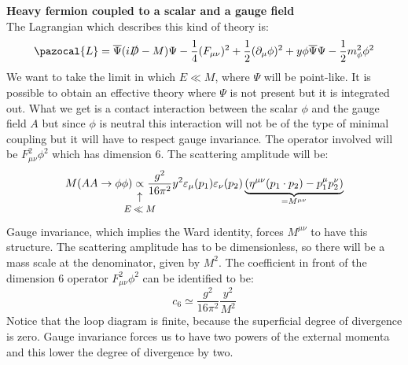 \documentclass[../main.tex]{subfiles}
\begin{document}
\begin{example}\textbf{Heavy fermion coupled to a scalar and a gauge field}\\
The Lagrangian which describes this kind of theory is:
\[
\pazocal{L}=\overline{\Psi}(i\slashed{D}-M)\Psi-\frac{1}{4}(F_{\mu\nu})^2+\frac{1}{2}(\partial_\mu\phi)^2+y\phi\overline{\Psi}\Psi-\frac{1}{2}m_\phi^2\phi^2
\]
We want to take the limit in which $E\ll M$, where $\Psi$ will be point-like. It is possible to obtain an effective theory where $\Psi$ is not present but it is integrated out. What we get is a contact interaction between the scalar $\phi$ and the gauge field $A$ but since $\phi$ is neutral this interaction will not be of the type of minimal coupling but it will have to respect gauge invariance. 
The operator involved will be $F^2_{\mu\nu}\phi^2$ which has dimension 6. The scattering amplitude will be:
\[
M(AA\to\phi\phi)\underset{\mathclap{\tikz \node {$\uparrow$} node [below=1ex] {\footnotesize $E\ll M$ };}}{\propto}\frac{g^2}{16\pi^2}y^2\varepsilon_\mu(p_1)\varepsilon_\nu(p_2)\underbrace{(\eta^{\mu\nu}(p_1\cdot p_2)-p_1^\mu p_2^\nu)}_{=M^{\mu\nu}}
\]
Gauge invariance, which implies the Ward identity, forces $M^{\mu\nu}$ to have this structure. The scattering amplitude has to be dimensionless, so there will be a mass scale at the denominator, given by $M^2$. The coefficient in front of the dimension 6 operator $F_{\mu\nu}^2\phi^2$ can be identified to be:
\[
c_6\simeq\frac{g^2}{16\pi^2}\frac{y^2}{M^2}
\]
Notice that the loop diagram is finite, because the superficial degree of divergence is zero. Gauge invariance forces us to have two powers of the external momenta and this lower the degree of divergence by two.
\end{example}
\end{document}
